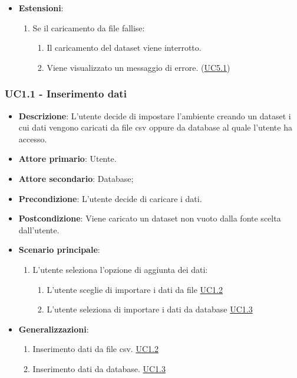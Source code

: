 \begin{itemize}
    \item \textbf{Estensioni}:
    \begin{enumerate}
        \item Se il caricamento da file fallise:
        \begin{enumerate}
            \item Il caricamento del dataset viene interrotto.
            \item Viene visualizzato un messaggio di errore. (\hyperref[ssub:uc5.1]{UC5.1})
        \end{enumerate}
    \end{enumerate}
\end{itemize}

\subsubsection{UC1.1 - Inserimento dati}
\label{ssub:uc1.1}
\begin{itemize}
    \item \textbf{Descrizione}: L'utente decide di impostare l'ambiente creando un dataset i cui 
                                dati vengono caricati da file csv oppure da database al quale l'utente ha accesso.

    \item \textbf{Attore primario}: Utente.
    \item \textbf{Attore secondario}: Database;
    
    \item \textbf{Precondizione}:   L'utente decide di caricare i dati.

    \item \textbf{Postcondizione}:  Viene caricato un dataset non vuoto dalla fonte scelta dall'utente. 

	\item \textbf{Scenario principale}:
		\begin{enumerate}
			\item L'utente seleziona l'opzione di aggiunta dei dati:
            \begin{enumerate}
                \item L'utente sceglie di importare i dati da file \hyperref[ssub:uc1.2]{UC1.2}
                \item L'utente seleziona di importare i dati da database \hyperref[ssub:uc1.3]{UC1.3}
            \end{enumerate}
        \end{enumerate}

        \item \textbf{Generalizzazioni}:
        \begin{enumerate}
            \item Inserimento dati da file csv. \hyperref[ssub:uc1.2]{UC1.2}
            \item Inserimento dati da database. \hyperref[ssub:uc1.3]{UC1.3}
        \end{enumerate}
\end{itemize}



